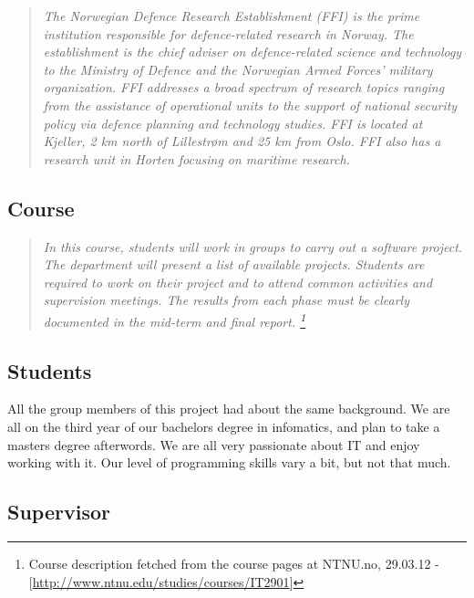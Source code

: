     \begin{quotation}
    \em The Norwegian Defence Research Establishment (FFI) is the prime institution responsible for defence-related research in Norway. The establishment is the chief adviser on defence-related science and technology to the Ministry of Defence and the Norwegian Armed Forces’ military organization. FFI addresses a broad spectrum of research topics ranging from the assistance of operational units to the support of national security policy via defence planning and technology studies. FFI is located at Kjeller, 2 km north of Lillestrøm and 25 km from Oslo. FFI also has a research unit in Horten focusing on maritime research.
    \end{quotation}
    
    \subsection{Course}\label{Course}
    \begin{quotation}
    \em In this course, students will work in groups to carry out a software project. The department will present a list of available projects. Students are required to work on their project and to attend common activities and supervision meetings. The results from each phase must be clearly documented in the mid-term and final report.
    \footnote{Course description fetched from the course pages at NTNU.no, 29.03.12 - [\url{http://www.ntnu.edu/studies/courses/IT2901}]}
    \end{quotation}
    
    \subsection{Students}\label{Students}
    
    
    All the group members of this project had about the same background. We are all on the third year of our bachelors degree in infomatics, and plan to take a masters degree afterwords. We are all very passionate about IT and enjoy working with it. Our level of programming skills vary a bit, but not that much.

    
    
    \subsection{Supervisor}\label{Supervisor}
    
